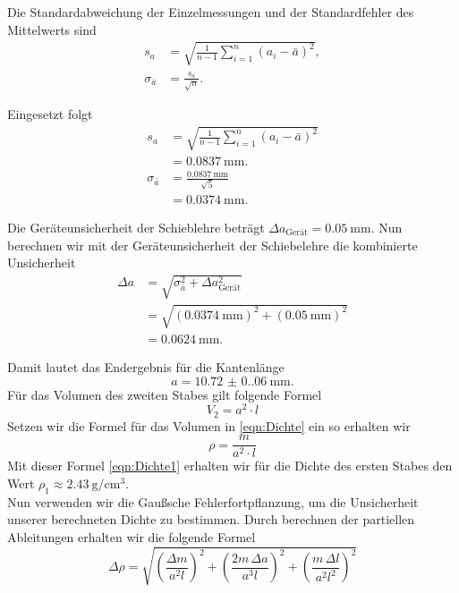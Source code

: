 Die Standardabweichung der Einzelmessungen und der Standardfehler des Mittelwerts sind
\begin{align}
  s_a &= \sqrt{\frac{1}{n-1} \sum_{i=1}^{n} \left( a_i - \bar{a} \right)^2}, \\
  \sigma_{\bar{a}} &= \frac{s_a}{\sqrt{n}}.
\end{align}

Eingesetzt folgt
\begin{align}
  s_a &= \sqrt{\frac{1}{n-1} \sum_{i=1}^{n} \left( a_i - \bar{a} \right)^2} \nonumber \\
      &= \qty{0.0837}{\milli\meter}. \\
  \sigma_{\bar{a}} &= \frac{\qty{0.0837}{\milli\meter}}{\sqrt{5}} \nonumber \\
      &= \qty{0.0374}{\milli\meter}.
\end{align}

Die Geräteunsicherheit der Schieblehre beträgt $\Delta a_\text{Gerät} = \qty{0.05}{\milli\meter}$. Nun berechnen wir mit der Geräteunsicherheit der Schiebelehre die kombinierte Unsicherheit
\begin{align}
  \Delta a &= \sqrt{\sigma_{\bar{a}}^2 + \Delta a_\text{Gerät}^2} \nonumber \\
           &= \sqrt{\left( \qty{0.0374}{\milli\meter} \right)^2 + \left( \qty{0.05}{\milli\meter} \right)^2} \nonumber \\
           &= \qty{0.0624}{\milli\meter}.
\end{align}

Damit lautet das Endergebnis für die Kantenlänge
\label{sec:aBerechnung}
\begin{equation}
  a = \qty{10.72(0.06)}{\milli\meter}.
\end{equation}
Für das Volumen des zweiten Stabes gilt folgende Formel
\begin{equation}
  V_2 = a^2 \cdot l
\end{equation}
Setzen wir die Formel für das Volumen in \ref{eqn:Dichte} ein so erhalten wir
\begin{equation}
  \rho = \frac{m}{a^2 \cdot l}
  \label{eqn:Dichte1}
\end{equation}
Mit dieser Formel \ref{eqn:Dichte1} erhalten wir für die Dichte des ersten Stabes den Wert $ \rho_1 \approx \qty{2.43}{\gram\per\centi\metre\cubed}$.\\
Nun verwenden wir die Gaußsche Fehlerfortpflanzung, um die Unsicherheit unserer berechneten Dichte zu bestimmen.
Durch berechnen der partiellen Ableitungen erhalten wir die folgende Formel
\begin{equation}
  \Delta\rho = \sqrt{
    \left( \frac{\Delta m}{a^2 l} \right)^2 +
    \left( \frac{2m \, \Delta a}{a^3 l} \right)^2 +
    \left( \frac{m \, \Delta l}{a^2 l^2} \right)^2
  }
\end{equation}

